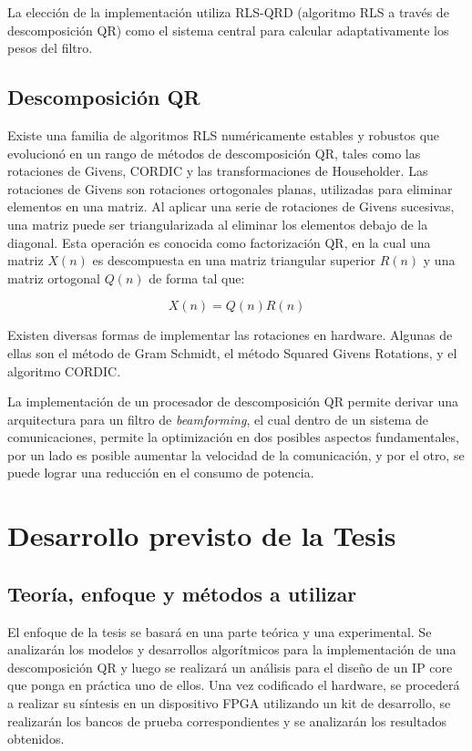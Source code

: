\documentclass[a4paper]{article}
\begin{document}
La elección de la implementación utiliza RLS-QRD (algoritmo RLS a través de descomposición QR) como el sistema central para calcular adaptativamente los pesos del filtro.

\subsection{Descomposición QR}

Existe una familia de algoritmos RLS numéricamente estables y robustos que evolucionó en un rango de métodos de descomposición QR, tales como las rotaciones de Givens, CORDIC y las transformaciones de Householder. Las rotaciones de Givens son rotaciones ortogonales planas, utilizadas para eliminar elementos en una matriz. Al aplicar una serie de rotaciones de Givens sucesivas, una matriz puede ser triangularizada al eliminar los elementos debajo de la diagonal. Esta operación es conocida como factorización QR, en la cual una matriz $X(n)$ es descompuesta en una matriz triangular superior $R(n)$ y una matriz ortogonal $Q(n)$ de forma tal que:

\[
X(n) = Q(n)R(n)
\]

Existen diversas formas de implementar las rotaciones en hardware. Algunas de ellas son el método de Gram Schmidt, el método Squared Givens Rotations, y el algoritmo CORDIC.

La implementación de un procesador de descomposición QR permite derivar una arquitectura para un filtro de \textit{beamforming}, el cual dentro de un sistema de comunicaciones, permite la optimización en dos posibles aspectos fundamentales, por un lado es posible aumentar la velocidad de la comunicación, y por el otro, se puede lograr una reducción en el consumo de potencia.

\section{Desarrollo previsto de la Tesis}

\subsection{Teoría, enfoque y métodos a utilizar}

El enfoque de la tesis se basará en una parte teórica y una experimental.
Se analizarán los modelos y desarrollos algorítmicos para la implementación de una descomposición QR y luego se realizará un análisis para el diseño de un IP core que ponga en práctica uno de ellos. Una vez codificado el hardware, se procederá a realizar su síntesis en un dispositivo FPGA utilizando un kit de desarrollo, se realizarán los bancos de prueba correspondientes y se analizarán los resultados obtenidos. 
\end{document}
